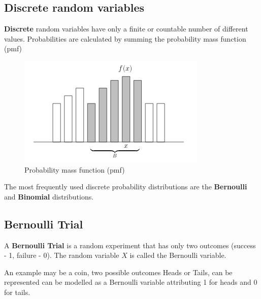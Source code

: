 \documentclass{report}
\theoremstyle{definition}
\newtheorem{definition}{Definition}
\theoremstyle{plain}
\theoremstyle{remark}
\begin{document}
  \subsection{Discrete random variables}
  \textbf{Discrete} random variables have only a finite or countable number of
  different values. Probabilities are calculated by summing the probability
  mass function (pmf)
  \begin{figure}[h]
    \centering
    \includegraphics[width=0.6\linewidth]{1.png}
    \caption{Probability mass function (pmf)}%
    \label{fig:1}
  \end{figure}
  The most frequently used discrete probability distributions are the
  \textbf{Bernoulli} and \textbf{Binomial} distributions.

  \subsection{Bernoulli Trial}
  A \textbf{Bernoulli Trial} is a random experiment that has only two outcomes
  (success - 1, failure - 0). The random variable $ X $ is called the Bernoulli
  variable.
  \par An example may be a coin, two possible outcomes Heads or Tails, can be
  represented can be modelled as a Bernoulli variable attributing 1 for heads
  and 0 for tails.

  \begin{center}
  \end{center}
\end{document}
